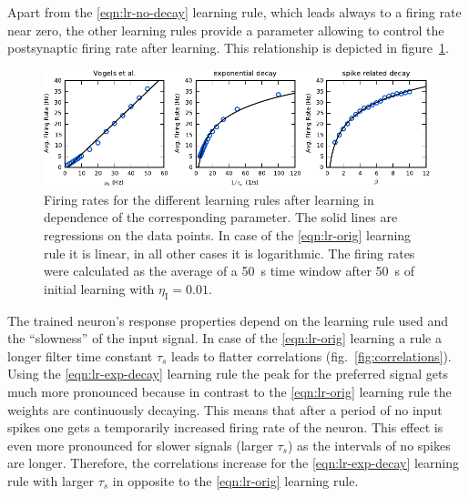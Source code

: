 \documentclass[11pt,a4paper]{scrartcl}
\newcommand{\I}[1]{_{\text{I}#1}}
\begin{document}
Apart from the \ref{eqn:lr-no-decay} learning rule, which leads always to 
a firing rate near zero, the other learning rules provide a parameter allowing 
to control the postsynaptic firing rate after learning. This relationship is 
depicted in figure~\ref{fig:rates}.

\begin{figure}
    \centering
    \includegraphics{figures/rates}
    \caption{Firing rates for the different learning rules after learning in 
        dependence of the corresponding parameter. The solid lines are 
        regressions on the data points. In case of the \ref{eqn:lr-orig} 
        learning rule it is linear, in all other cases it is logarithmic.  The 
        firing rates were calculated as the average of a \SI{50}{\second} time 
        window after \SI{50}{\second} of initial learning with $\eta\I{} 
        = 0.01$.} \label{fig:rates}
\end{figure}

The trained neuron's response properties depend on the learning rule used and 
the ``slowness'' of the input signal. In case of the \ref{eqn:lr-orig} learning 
a rule a longer filter time constant $\tau_s$ leads to flatter correlations 
(fig.~\ref{fig:correlations}).
Using the \ref{eqn:lr-exp-decay} learning rule the peak for the preferred signal 
gets much more pronounced because in contrast to the \ref{eqn:lr-orig} learning 
rule the weights are continuously decaying. This means that after a period of no 
input spikes one gets a temporarily increased firing rate of the neuron. This 
effect is even more pronounced for slower signals (larger $\tau_s$) as the 
intervals of no spikes are longer. Therefore, the correlations increase for the 
\ref{eqn:lr-exp-decay} learning rule with larger $\tau_s$ in opposite to the 
\ref{eqn:lr-orig} learning rule.
\end{document}
